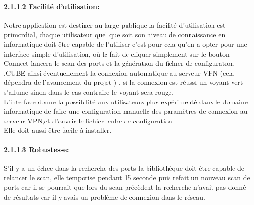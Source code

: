 \documentclass[12pt,a4paper]{article}
\begin{document}
\paragraph{2.1.1.2 Facilité d'utilisation: }
Notre application est destiner au large publique la facilité d’utilisation est primordial, chaque utilisateur quel que soit son niveau de connaissance en informatique doit être capable de l’utiliser c’est pour cela qu’on a opter pour une interface simple d’utilisation, où le fait de cliquer simplement sur le bouton Connect lancera le scan des ports et la génération du fichier de configuration .CUBE ainsi éventuellement la connexion automatique au serveur VPN (cela dépendra de l’avancement du projet ) , si la connexion est réussi un voyant vert s’allume sinon dans le cas contraire le voyant sera rouge.\\

L'interface donne la possibilité aux utilisateurs plus expérimenté dans le domaine informatique de faire une configuration manuelle des paramètres de connexion au serveur VPN,et d'ouvrir le fichier .cube de configuration.\\
Elle doit aussi être facile à installer.
 \setlength{\parskip}{1ex}
\paragraph{2.1.1.3 Robustesse: }
S’il y a un échec dans la recherche des ports la bibliothèque doit être capable de relancer le scan, elle temporise pendant 15 seconde puis refait un nouveau scan de ports car il se pourrait que lors du scan précèdent la recherche n’avait pas donné de résultats car il y’avais un problème de connexion dans le réseau.
\end{document}
